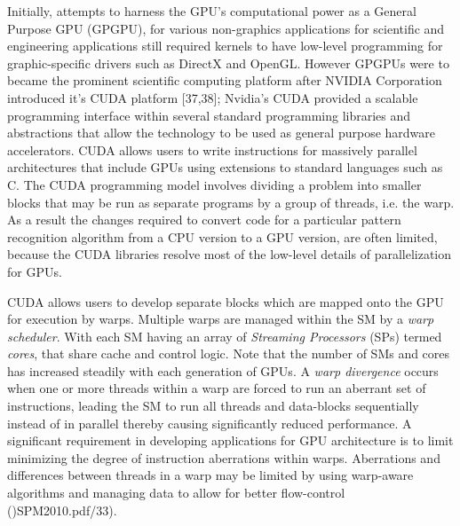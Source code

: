 \documentclass[10pt]{article}[draft]
\begin{document}
Initially, attempts to harness the GPU’s computational power as a General Purpose GPU (GPGPU), for various non-graphics applications for scientific and engineering applications still required  kernels to have low-level programming for graphic-specific drivers such as DirectX and OpenGL. However GPGPUs were to became the prominent scientific computing platform  after NVIDIA Corporation introduced it's CUDA platform [37,38]; Nvidia's CUDA provided a scalable programming interface within several standard programming libraries and abstractions that allow the technology to be used as general purpose hardware accelerators.  CUDA allows users to write instructions for massively parallel architectures that include GPUs using extensions to standard languages such as C. The CUDA programming model involves dividing a problem into smaller blocks that may be run as separate programs by a group of threads, i.e. the warp. As a result the changes required to convert code for a particular pattern recognition algorithm from a CPU version to a GPU version, are often limited, because the CUDA libraries resolve most of the low-level details of parallelization for GPUs. 

CUDA allows users to develop separate blocks which are mapped onto the GPU for execution by warps. Multiple warps are managed within the SM by a \emph{warp scheduler}. With each SM having an array of \emph{Streaming Processors} (SPs) termed \emph{cores}, that share cache and control logic. Note that the number of SMs and cores has increased steadily with each generation of GPUs. A \emph{warp divergence} occurs when one or more threads within a warp are forced to run an aberrant set of instructions, leading the SM to run all threads and data-blocks sequentially instead of in parallel thereby causing significantly reduced performance.  A significant requirement in developing  applications for GPU architecture is to limit minimizing the degree of instruction aberrations within warps. Aberrations and differences between threads in a warp may be limited by using warp-aware algorithms and managing data to allow for better flow-control ()SPM2010.pdf/33).
\end{document}
